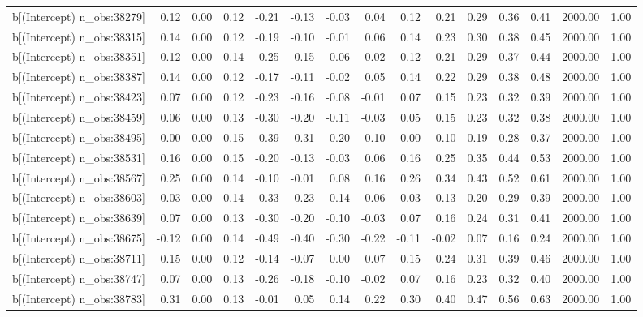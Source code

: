 \begin{table}[ht]
\begin{tabular}{rrrrrrrrrrrrrrr}
  b[(Intercept) n\_obs:38279] & 0.12 & 0.00 & 0.12 & -0.21 & -0.13 & -0.03 & 0.04 & 0.12 & 0.21 & 0.29 & 0.36 & 0.41 & 2000.00 & 1.00 \\ 
  b[(Intercept) n\_obs:38315] & 0.14 & 0.00 & 0.12 & -0.19 & -0.10 & -0.01 & 0.06 & 0.14 & 0.23 & 0.30 & 0.38 & 0.45 & 2000.00 & 1.00 \\ 
  b[(Intercept) n\_obs:38351] & 0.12 & 0.00 & 0.14 & -0.25 & -0.15 & -0.06 & 0.02 & 0.12 & 0.21 & 0.29 & 0.37 & 0.44 & 2000.00 & 1.00 \\ 
  b[(Intercept) n\_obs:38387] & 0.14 & 0.00 & 0.12 & -0.17 & -0.11 & -0.02 & 0.05 & 0.14 & 0.22 & 0.29 & 0.38 & 0.48 & 2000.00 & 1.00 \\ 
  b[(Intercept) n\_obs:38423] & 0.07 & 0.00 & 0.12 & -0.23 & -0.16 & -0.08 & -0.01 & 0.07 & 0.15 & 0.23 & 0.32 & 0.39 & 2000.00 & 1.00 \\ 
  b[(Intercept) n\_obs:38459] & 0.06 & 0.00 & 0.13 & -0.30 & -0.20 & -0.11 & -0.03 & 0.05 & 0.15 & 0.23 & 0.32 & 0.38 & 2000.00 & 1.00 \\ 
  b[(Intercept) n\_obs:38495] & -0.00 & 0.00 & 0.15 & -0.39 & -0.31 & -0.20 & -0.10 & -0.00 & 0.10 & 0.19 & 0.28 & 0.37 & 2000.00 & 1.00 \\ 
  b[(Intercept) n\_obs:38531] & 0.16 & 0.00 & 0.15 & -0.20 & -0.13 & -0.03 & 0.06 & 0.16 & 0.25 & 0.35 & 0.44 & 0.53 & 2000.00 & 1.00 \\ 
  b[(Intercept) n\_obs:38567] & 0.25 & 0.00 & 0.14 & -0.10 & -0.01 & 0.08 & 0.16 & 0.26 & 0.34 & 0.43 & 0.52 & 0.61 & 2000.00 & 1.00 \\ 
  b[(Intercept) n\_obs:38603] & 0.03 & 0.00 & 0.14 & -0.33 & -0.23 & -0.14 & -0.06 & 0.03 & 0.13 & 0.20 & 0.29 & 0.39 & 2000.00 & 1.00 \\ 
  b[(Intercept) n\_obs:38639] & 0.07 & 0.00 & 0.13 & -0.30 & -0.20 & -0.10 & -0.03 & 0.07 & 0.16 & 0.24 & 0.31 & 0.41 & 2000.00 & 1.00 \\ 
  b[(Intercept) n\_obs:38675] & -0.12 & 0.00 & 0.14 & -0.49 & -0.40 & -0.30 & -0.22 & -0.11 & -0.02 & 0.07 & 0.16 & 0.24 & 2000.00 & 1.00 \\ 
  b[(Intercept) n\_obs:38711] & 0.15 & 0.00 & 0.12 & -0.14 & -0.07 & 0.00 & 0.07 & 0.15 & 0.24 & 0.31 & 0.39 & 0.46 & 2000.00 & 1.00 \\ 
  b[(Intercept) n\_obs:38747] & 0.07 & 0.00 & 0.13 & -0.26 & -0.18 & -0.10 & -0.02 & 0.07 & 0.16 & 0.23 & 0.32 & 0.40 & 2000.00 & 1.00 \\ 
  b[(Intercept) n\_obs:38783] & 0.31 & 0.00 & 0.13 & -0.01 & 0.05 & 0.14 & 0.22 & 0.30 & 0.40 & 0.47 & 0.56 & 0.63 & 2000.00 & 1.00 \\ 

\end{tabular}
\end{table}
